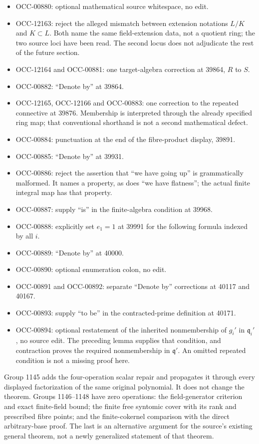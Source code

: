 \begin{itemize}
\tightlist
\item
  OCC-00880: optional mathematical source whitespace, no edit.
\item
  OCC-12163: reject the alleged mismatch between extension notations \(L/K\) and \(K\subset L\). Both name the same field-extension data, not a quotient ring; the two source loci have been read. The second locus does not adjudicate the rest of the future section.
\item
  OCC-12164 and OCC-00881: one target-algebra correction at 39864, \(R\) to \(S\).
\item
  OCC-00882: ``Denote by'' at 39864.
\item
  OCC-12165, OCC-12166 and OCC-00883: one correction to the repeated connective at 39876. Membership is interpreted through the already specified ring map; that conventional shorthand is not a second mathematical defect.
\item
  OCC-00884: punctuation at the end of the fibre-product display, 39891.
\item
  OCC-00885: ``Denote by'' at 39931.
\item
  OCC-00886: reject the assertion that ``we have going up'' is grammatically malformed. It names a property, as does ``we have flatness''; the actual finite integral map has that property.
\item
  OCC-00887: supply ``is'' in the finite-algebra condition at 39968.
\item
  OCC-00888: explicitly set \(e_1=1\) at 39991 for the following formula indexed by all \(i\).
\item
  OCC-00889: ``Denote by'' at 40000.
\item
  OCC-00890: optional enumeration colon, no edit.
\item
  OCC-00891 and OCC-00892: separate ``Denote by'' corrections at 40117 and 40167.
\item
  OCC-00893: supply ``to be'' in the contracted-prime definition at 40171.
\item
  OCC-00894: optional restatement of the inherited nonmembership of \(g_i'\) in \(\mathfrak q_i'\), no source edit. The preceding lemma supplies that condition, and contraction proves the required nonmembership in \(\mathfrak q'\). An omitted repeated condition is not a missing proof here.
\end{itemize}

Group 1145 adds the four-operation scalar repair and propagates it through every displayed factorization of the same original polynomial. It does not change the theorem. Groups 1146--1148 have zero operations: the field-generator criterion and exact finite-field bound; the finite free syntomic cover with its rank and prescribed fibre points; and the finite-cokernel comparison with the direct arbitrary-base proof. The last is an alternative argument for the source's existing general theorem, not a newly generalized statement of that theorem.


